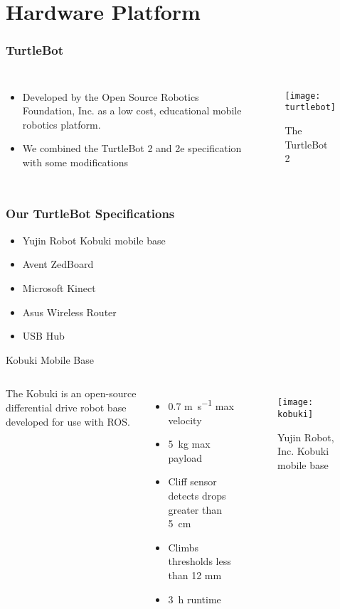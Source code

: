 \documentclass[14pt]{beamer}
\begin{document}
\section{Hardware Platform}
\begin{frame}
\frametitle{TurtleBot}
\begin{columns}
\begin{itemize}
\item Developed by the Open Source Robotics Foundation, Inc. as a low cost, educational mobile robotics platform.
\vspace{14pt}
\item We combined the TurtleBot 2 and 2e specification with some modifications
\end{itemize}
\begin{figure}
\centering
\texttt{[image: turtlebot]}
\caption{The TurtleBot 2~\cite{TurtleBot}}
\label{turtlebot}
\end{figure}
\end{columns}
\end{frame}

\begin{frame}
\frametitle{Our TurtleBot Specifications}
\begin{itemize}
\item Yujin Robot Kobuki mobile base
\item Avent ZedBoard
\item Microsoft Kinect
\item Asus Wireless Router
\item USB Hub
\end{itemize}
\end{frame}

\begin{frame}{Kobuki Mobile Base}
\begin{columns}
The Kobuki is an open-source differential drive robot base developed for use with ROS.
\begin{itemize}
\item 0.7 \si{\meter\per\second} max velocity
\item \SI{5}{\kilogram} max payload
\item Cliff sensor detects drops greater than \SI{5}{\cm}
\item Climbs thresholds less than 12 \si{\mm}
\item \SI{3}{\hour} runtime
\end{itemize}
\begin{figure}
\texttt{[image: kobuki]}
\caption{Yujin Robot, Inc. Kobuki mobile base~\cite{Kobuki}}
\end{figure}
\end{columns}
\end{frame}
\end{document}
